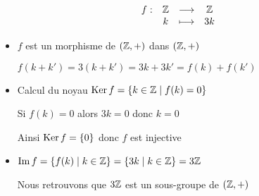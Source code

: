 \begin{frame}

\begin{exemple}

$$
\begin{array}{lccc}
f : & \mathbb{Z} & \longrightarrow & \mathbb{Z}  \\
    & k & \longmapsto & 3k  \\
\end{array}$$

\pause

\begin{itemize}
  \item $f$ est un morphisme de $(\mathbb{Z},+)$ dans $(\mathbb{Z},+)$

\pause

  $f(k+k')= 3(k+k')= 3k + 3k'=f(k)+f(k')$

\pause

   \item Calcul du noyau $\mathop{\text{Ker}}\nolimits f = \{ k \in \mathbb{Z} \mid f(k)=0\}$

\pause

Si $f(k)=0$ alors $3k=0$ donc $k=0$

\pause

Ainsi $\mathop{\text{Ker}}\nolimits f = \{ 0 \}$  donc $f$ est injective

\pause

  \item $\mathop{\text{Im}}\nolimits f = \{ f(k) \mid k \in \mathbb{Z} \} = \{ 3k \mid k \in\mathbb{Z}\} = 3\mathbb{Z}$

\pause

Nous retrouvons que $3\mathbb{Z}$ est un sous-groupe de $(\mathbb{Z},+)$
\end{itemize}

\end{exemple}
\end{frame}

